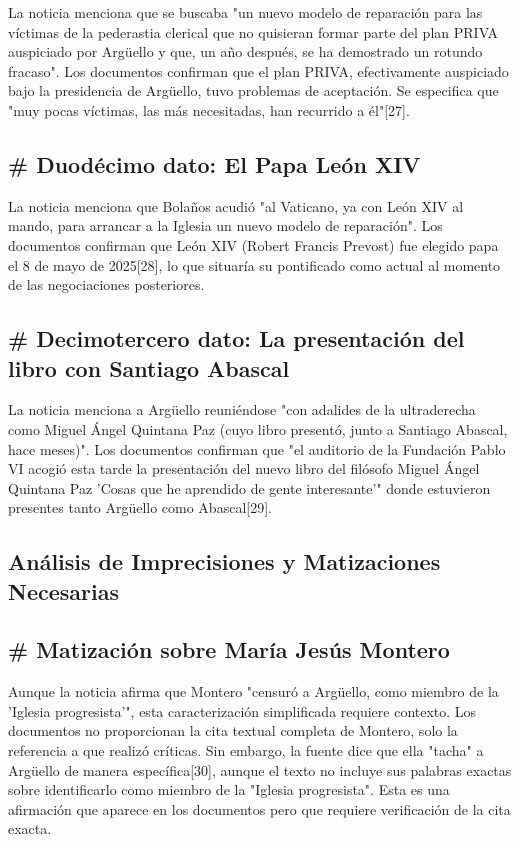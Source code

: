 \documentclass[10pt,a4paper]{article}
\begin{document}
 La noticia menciona que se buscaba "un nuevo modelo de reparaci\'{o}n para las v\'{i}ctimas de la pederastia clerical que no quisieran formar parte del plan PRIVA auspiciado por Arg\"{u}ello y que, un a\~{n}o despu\'{e}s, se ha demostrado un rotundo fracaso". Los documentos confirman que el plan PRIVA, efectivamente auspiciado bajo la presidencia de Arg\"{u}ello, tuvo problemas de aceptaci\'{o}n. Se especifica que "muy pocas v\'{i}ctimas, las m\'{a}s necesitadas, han recurrido a \'{e}l"[27]. 

\subsection*{\# Duod\'{e}cimo dato: El Papa Le\'{o}n XIV}

 La noticia menciona que Bola\~{n}os acudi\'{o} "al Vaticano, ya con Le\'{o}n XIV al mando, para arrancar a la Iglesia un nuevo modelo de reparaci\'{o}n". Los documentos confirman que Le\'{o}n XIV (Robert Francis Prevost) fue elegido papa el 8 de mayo de 2025[28], lo que situar\'{i}a su pontificado como actual al momento de las negociaciones posteriores. 

\subsection*{\# Decimotercero dato: La presentaci\'{o}n del libro con Santiago Abascal}

 La noticia menciona a Arg\"{u}ello reuni\'{e}ndose "con adalides de la ultraderecha como Miguel \'{A}ngel Quintana Paz (cuyo libro present\'{o}, junto a Santiago Abascal, hace meses)". Los documentos confirman que "el auditorio de la Fundaci\'{o}n Pablo VI acogi\'{o} esta tarde la presentaci\'{o}n del nuevo libro del fil\'{o}sofo Miguel \'{A}ngel Quintana Paz 'Cosas que he aprendido de gente interesante'" donde estuvieron presentes tanto Arg\"{u}ello como Abascal[29]. 

\subsection*{An\'{a}lisis de Imprecisiones y Matizaciones Necesarias}



\subsection*{\# Matizaci\'{o}n sobre Mar\'{i}a Jes\'{u}s Montero}

 Aunque la noticia afirma que Montero "censur\'{o} a Arg\"{u}ello, como miembro de la 'Iglesia progresista'", esta caracterizaci\'{o}n simplificada requiere contexto. Los documentos no proporcionan la cita textual completa de Montero, solo la referencia a que realiz\'{o} cr\'{i}ticas. Sin embargo, la fuente dice que ella "tacha" a Arg\"{u}ello de manera espec\'{i}fica[30], aunque el texto no incluye sus palabras exactas sobre identificarlo como miembro de la "Iglesia progresista". Esta es una afirmaci\'{o}n que aparece en los documentos pero que requiere verificaci\'{o}n de la cita exacta. 
\end{document}

